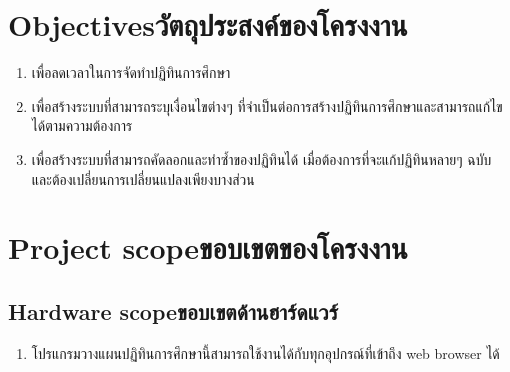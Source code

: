 

\section{\ifenglish Objectives\else วัตถุประสงค์ของโครงงาน\fi}
\begin{enumerate}
    \item เพื่อลดเวลาในการจัดทำปฏิทินการศึกษา
    \item เพื่อสร้างระบบที่สามารถระบุเงื่อนไขต่างๆ ที่จำเป็นต่อการสร้างปฏิทินการศึกษาและสามารถแก้ไขได้ตามความต้องการ
    \item เพื่อสร้างระบบที่สามารถคัดลอกและทำซ้ำของปฏิทินได้ เมื่อต้องการที่จะแก้ปฏิทินหลายๆ ฉบับ และต้องเปลี่ยนการเปลี่ยนแปลงเพียงบางส่วน
\end{enumerate}

\section{\ifenglish Project scope\else ขอบเขตของโครงงาน\fi}

\subsection{\ifenglish Hardware scope\else ขอบเขตด้านฮาร์ดแวร์\fi}
\begin{enumerate}
\item โปรแกรมวางแผนปฏิทินการศึกษานี้สามารถใช้งานได้กับทุกอุปกรณ์ที่เข้าถึง web browser ได้ 
\end{enumerate}

